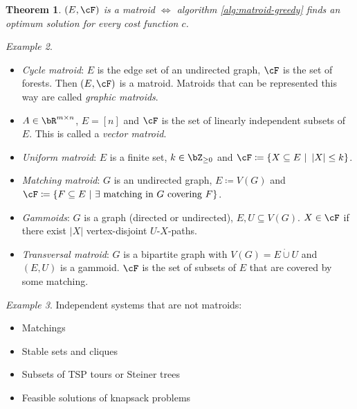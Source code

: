 \documentclass[11pt, a4paper]{article}
\newcommand{\abs}[1]{\left\lvert#1\right\rvert}
\newcommand{\set}[1]{\{#1\}}
\newtheorem{theorem}{Theorem}[section]
\theoremstyle{remark}
\newtheorem{nexample}[theorem]{Example}
\theoremstyle{definition}
\begin{document}
\begin{theorem}
	$(E,\cF)$ is a matroid $\Leftrightarrow$ algorithm \ref{alg:matroid-greedy}
	finds an optimum solution for every cost function $c$.
\end{theorem}

\begin{nexample}\
	\begin{itemize}
		\item \emph{Cycle matroid}: $E$ is the edge set of an undirected graph,
		$\cF$ is the set of forests. Then $(E,\cF)$ is a matroid. Matroids
		that can be represented this way are called \emph{graphic matroids}.

		\item $A\in\bR^{m\times n}$, $E=[n]$ and $\cF$ is the set of linearly
		independent subsets of $E$. This is called a \emph{vector matroid}.

		\item \emph{Uniform matroid}: $E$ is a finite set, $k\in\bZ_{\geq0}$
		and $\cF\coloneqq \set{X\subseteq E\ |\ \abs{X}\leq k}$.

		\item \emph{Matching matroid}: $G$ is an undirected graph, $E\coloneqq
			V(G)$ and $\cF\coloneqq \set{F\subseteq E\ |\ \exists\text{ matching
					in $G$ covering $F$}}$.

		\item \emph{Gammoids}: $G$ is a graph (directed or undirected), $E,U
			\subseteq V(G)$. $X\in\cF$ if there exist $\abs{X}$ vertex-disjoint
		$U$-$X$-paths.

		\item \emph{Transversal matroid}: $G$ is a bipartite graph with
		$V(G)=E\dot\cup U$ and $(E,U)$ is a gammoid. $\cF$ is the set of
		subsets of $E$ that are covered by some matching.
	\end{itemize}
\end{nexample}

\begin{nexample}
	Independent systems that are not matroids:
	\begin{itemize}
		\item Matchings
		\item Stable sets and cliques
		\item Subsets of TSP tours or Steiner trees
		\item Feasible solutions of knapsack problems
	\end{itemize}
\end{nexample}
\end{document}

